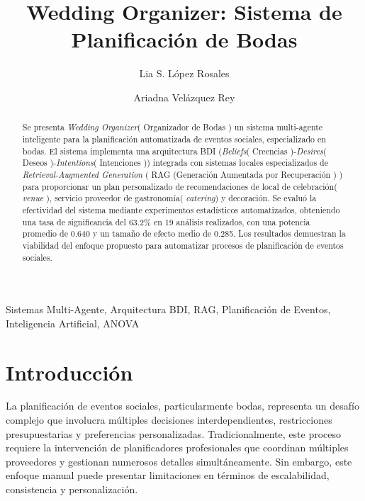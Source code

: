 \documentclass[runningheads,a4paper]{llncs}
\newcommand{\keywords}[1]{\par\addvspace\baselineskip
\noindent\keywordname\enspace\ignorespaces#1}
\begin{document}
\mainmatter

\title{Wedding Organizer: Sistema de Planificación de Bodas}


\author{Lia S. López Rosales\and Ariadna Velázquez Rey}


\maketitle

\begin{abstract}
Se presenta \textit{Wedding Organizer}( Organizador de Bodas ) un sistema multi-agente inteligente para la planificación automatizada de eventos sociales, especializado en bodas. El sistema implementa una arquitectura BDI (\textit{Beliefs}( Creencias )-\textit{Desires}( Deseos )-\textit{Intentions}( Intenciones ))\cite{rao1995bdi} integrada con sistemas locales especializados de \textit{Retrieval-Augmented Generation} ( RAG (Generación Aumentada por Recuperación ) ) \cite{lewis2020retrieval} para proporcionar un plan personalizado de recomendaciones de local de celebración( \textit{venue} ), servicio proveedor de gastronomía( \textit{catering}) y decoración. Se evaluó la efectividad del sistema mediante experimentos estadísticos automatizados, obteniendo una tasa de significancia del 63.2\% en 19 análisis realizados, con una potencia promedio de 0.640 y un tamaño de efecto medio de 0.285. Los resultados demuestran la viabilidad del enfoque propuesto para automatizar procesos de planificación de eventos sociales.
\end{abstract}

\keywords{Sistemas Multi-Agente, Arquitectura BDI, RAG, Planificación de Eventos, Inteligencia Artificial, ANOVA}

\section{Introducción}

La planificación de eventos sociales, particularmente bodas, representa un desafío complejo que involucra múltiples decisiones interdependientes, restricciones presupuestarias y preferencias personalizadas. Tradicionalmente, este proceso requiere la intervención de planificadores profesionales que coordinan múltiples proveedores y gestionan numerosos detalles simultáneamente. Sin embargo, este enfoque manual puede presentar limitaciones en términos de escalabilidad, consistencia y personalización.
\end{document}
